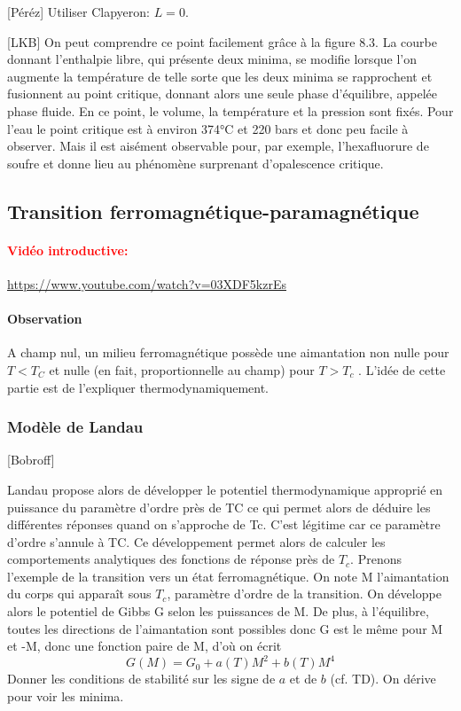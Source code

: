 \documentclass[11pt]{report}
\numberwithin{figure}{section}
\numberwithin{equation}{section}
\numberwithin{table}{section}
\newcommand{\1}{\boldsymbol{1}}
\begin{document}
[Péréz] Utiliser Clapyeron: $L=0$.


[LKB] On peut comprendre ce point facilement grâce à la figure 8.3. La courbe donnant l’enthalpie libre, qui présente deux minima, se modifie lorsque l’on augmente la température de
telle sorte que les deux minima se rapprochent et fusionnent au point critique, donnant alors une seule phase d’équilibre, appelée phase fluide. En ce point, le volume, la température et la pression sont fixés. Pour l’eau le point critique est à environ 374°C et 220 bars et donc peu facile à observer. Mais il est
aisément observable pour, par exemple, l’hexafluorure de soufre et donne lieu
au phénomène surprenant d’opalescence critique.

\subsection{Transition ferromagnétique-paramagnétique}

\paragraph*{\textcolor{red}{Vidéo introductive:}} \url{https://www.youtube.com/watch?v=03XDF5kzrEs}

\paragraph{Observation} A champ nul, un milieu ferromagnétique possède une
aimantation non nulle pour $T < T_C$ et nulle (en fait, proportionnelle au champ) pour $T>T_c$ . L’idée de cette partie est
de l’expliquer thermodynamiquement.

\subsubsection{Modèle de Landau}

[Bobroff]

Landau propose alors de développer le potentiel thermodynamique approprié en puissance du
paramètre d'ordre près de TC ce qui permet alors de déduire les différentes réponses quand on s’approche de Tc. C'est légitime car ce paramètre d'ordre s'annule à TC. Ce développement permet alors de calculer les comportements analytiques des fonctions de réponse près de $T_c$.
Prenons l'exemple de la transition vers un état ferromagnétique. On note M l'aimantation du corps qui apparaît sous $T_c$, paramètre d'ordre de la transition. On développe alors le potentiel
de Gibbs G selon les puissances de M. De plus, à l'équilibre, toutes les directions de l'aimantation sont possibles donc G est le même pour M et -M, donc une fonction paire de M, d'où on écrit
\begin{equation}
G(M) = G_0 + a(T) M^2 + b(T) M^4
\end{equation}
Donner les conditions de stabilité sur les signe de $a$ et de $b$ (cf. TD). On dérive pour voir les minima.
\end{document}
